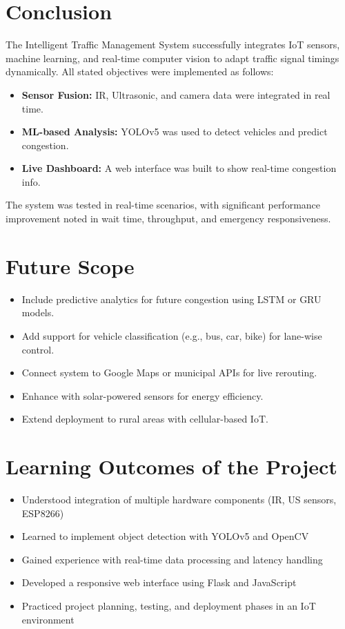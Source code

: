 \documentclass[12pt]{report}
\begin{document}
\section{Conclusion}
The Intelligent Traffic Management System successfully integrates IoT sensors, machine learning, and real-time computer vision to adapt traffic signal timings dynamically. All stated objectives were implemented as follows:
\begin{itemize}
\item \textbf{Sensor Fusion:} IR, Ultrasonic, and camera data were integrated in real time.
\item \textbf{ML-based Analysis:} YOLOv5 was used to detect vehicles and predict congestion.
\item \textbf{Live Dashboard:} A web interface was built to show real-time congestion info.
\end{itemize}

The system was tested in real-time scenarios, with significant performance improvement noted in wait time, throughput, and emergency responsiveness.

\section{Future Scope}
\begin{itemize}
\item Include predictive analytics for future congestion using LSTM or GRU models.
\item Add support for vehicle classification (e.g., bus, car, bike) for lane-wise control.
\item Connect system to Google Maps or municipal APIs for live rerouting.
\item Enhance with solar-powered sensors for energy efficiency.
\item Extend deployment to rural areas with cellular-based IoT.
\end{itemize}

\section{Learning Outcomes of the Project}
\begin{itemize}
\item Understood integration of multiple hardware components (IR, US sensors, ESP8266)
\item Learned to implement object detection with YOLOv5 and OpenCV
\item Gained experience with real-time data processing and latency handling
\item Developed a responsive web interface using Flask and JavaScript
\item Practiced project planning, testing, and deployment phases in an IoT environment
\end{itemize}
\end{document}
